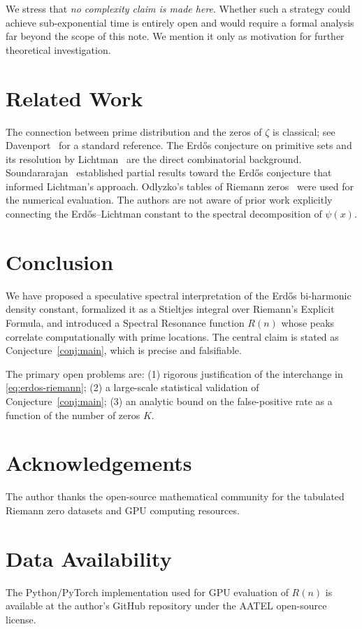 \documentclass[11pt,a4paper]{article}
\begin{document}
We stress that \emph{no complexity claim is made here}. Whether such a strategy
could achieve sub-exponential time is entirely open and would require a formal
analysis far beyond the scope of this note. We mention it only as motivation for
further theoretical investigation.

\section{Related Work}

The connection between prime distribution and the zeros of $\zeta$ is classical;
see Davenport~\cite{davenport2000} for a standard reference. The Erd\H{o}s
conjecture on primitive sets and its resolution by Lichtman~\cite{lichtman2019}
are the direct combinatorial background. Soundararajan~\cite{soundararajan2001}
established partial results toward the Erd\H{o}s conjecture that informed
Lichtman's approach. Odlyzko's tables of Riemann zeros~\cite{odlyzko} were used
for the numerical evaluation. The authors are not aware of prior work explicitly
connecting the Erd\H{o}s--Lichtman constant to the spectral decomposition of
$\psi(x)$.

\section{Conclusion}

We have proposed a speculative spectral interpretation of the Erd\H{o}s bi-harmonic
density constant, formalized it as a Stieltjes integral over Riemann's Explicit
Formula, and introduced a Spectral Resonance function $R(n)$ whose peaks correlate
computationally with prime locations. The central claim is stated as
Conjecture~\ref{conj:main}, which is precise and falsifiable.

The primary open problems are: (1) rigorous justification of the interchange in
\eqref{eq:erdos-riemann}; (2) a large-scale statistical validation of
Conjecture~\ref{conj:main}; (3) an analytic bound on the false-positive rate as a
function of the number of zeros $K$.

\section*{Acknowledgements}
The author thanks the open-source mathematical community for the tabulated Riemann
zero datasets and GPU computing resources.

\section*{Data Availability}
The Python/PyTorch implementation used for GPU evaluation of $R(n)$ is available
at the author's GitHub repository under the AATEL open-source license.
\end{document}

